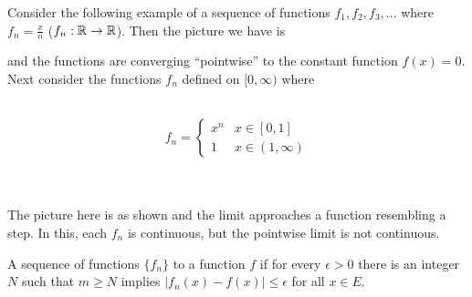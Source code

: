 \documentclass{mathnotes}
\begin{document}
Consider the following example of a sequence of functions $f_1,f_2,f_3,\ldots$
where $f_n=\frac{x}{n}$ ($f_n:\mathbb{R}\to\mathbb{R}$). Then the picture we have is
  \begin{center}
  \end{center}
and the functions are converging ``pointwise'' to the constant function
$f(x)=0$. Next consider the functions $f_n$ defined on $[0,\infty)$ where\\\\
\begin{minipage}{0.4\textwidth}
  $$f_n=\begin{cases}
    x^n & x\in[0,1] \\
    1 & x\in(1,\infty)
  \end{cases}$$
\end{minipage}
\begin{minipage}{0.6\textwidth}
  \begin{center}
  \end{center}
\end{minipage}\\\\
The picture here is as shown and the limit approaches a function resembling a
step. In this, each $f_n$ is continuous, but the pointwise limit is not
continuous.

\begin{defi}
  A sequence of functions $\{f_n\}$  to a function
  $f$ if for every $\epsilon>0$ there is an integer $N$ such that $m\ge N$
  implies $|f_n(x)-f(x)|\le\epsilon$ for all $x\in E$.
\end{defi}
\end{document}
